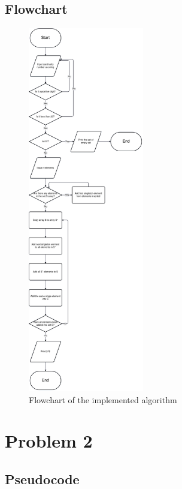 \documentclass[a4paper]{article}
\theoremstyle{plain}
\theoremstyle{definition}
\theoremstyle{remark}
\begin{document}
\subsection{Flowchart}
\begin{figure}[H]
	\centering
	\includegraphics[width=0.45\textwidth]{figures/cs.png}
	\caption{Flowchart of the implemented algorithm}
	\label{fig:algorithm}
\end{figure}
\newpage
\section{Problem 2}
\subsection{Pseudocode}
\end{document}
